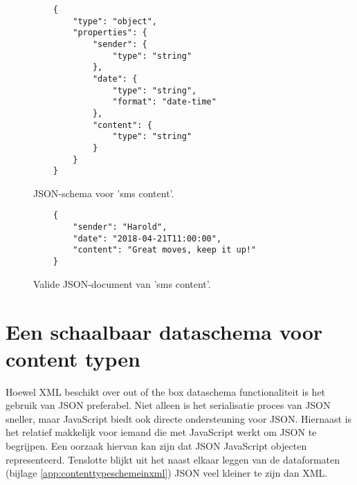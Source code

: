 \begin{figure}[htb]
    \centering
    \lstset{language=JSON}
    \begin{lstlisting}
    {
        "type": "object",
        "properties": {
            "sender": {
                "type": "string"
            },
            "date": {
                "type": "string",
                "format": "date-time"
            },
            "content": {
                "type": "string"
            }
        }
    }             
    \end{lstlisting}
    \caption{JSON-schema voor 'sms content'.}
    \label{fig:jsonschemasmscontent}
\end{figure}

\begin{figure}[htb]
    \centering
    \lstset{language=JSON}
    \begin{lstlisting}
    {
        "sender": "Harold",
        "date": "2018-04-21T11:00:00",
        "content": "Great moves, keep it up!"
    }                   
    \end{lstlisting}
    \caption{Valide JSON-document van 'sms content'.}
    \label{fig:jsonsmscontent}
\end{figure}

\pagebreak
\section{Een schaalbaar dataschema voor content typen}
Hoewel XML beschikt over out of the box dataschema functionaliteit is het gebruik van JSON preferabel. Niet alleen is het serialisatie proces van JSON sneller\cite{Nurseitov}, maar JavaScript biedt ook directe ondersteuning voor JSON. Hiernaast is het relatief makkelijk voor iemand die met JavaScript werkt om JSON te begrijpen. Een oorzaak hiervan kan zijn dat JSON JavaScript objecten representeerd. Tenslotte blijkt uit het naast elkaar leggen van de dataformaten (bijlage \autoref{app:contenttypeschemeinxml}) JSON veel kleiner te zijn dan XML.

